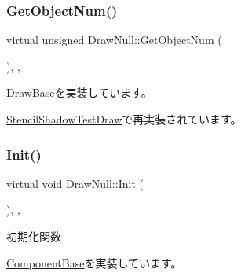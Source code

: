 \mbox{\label{class_draw_null_aaffa15d184f1d09512ccaa3bdad3f658}} 
\subsubsection{\texorpdfstring{Get\+Object\+Num()}{GetObjectNum()}}
{\footnotesize\ttfamily virtual unsigned Draw\+Null\+::\+Get\+Object\+Num (\begin{DoxyParamCaption}{ }\end{DoxyParamCaption})\hspace{0.3cm}{\ttfamily [inline]}, {\ttfamily [override]}, {\ttfamily [virtual]}}



\mbox{\hyperlink{class_draw_base_aed79e9db49de4fa2dff064495b877bcd}{Draw\+Base}}を実装しています。



\mbox{\hyperlink{class_stencil_shadow_test_draw_a8cc9a54a2bcb1fd006331fca1add02dc}{Stencil\+Shadow\+Test\+Draw}}で再実装されています。

\mbox{\label{class_draw_null_acd7fef3ccea1da537ac9507ffbb6dd2e}} 
\subsubsection{\texorpdfstring{Init()}{Init()}}
{\footnotesize\ttfamily virtual void Draw\+Null\+::\+Init (\begin{DoxyParamCaption}{ }\end{DoxyParamCaption})\hspace{0.3cm}{\ttfamily [inline]}, {\ttfamily [override]}, {\ttfamily [virtual]}}



初期化関数 



\mbox{\hyperlink{class_component_base_a125939d6befe42f28886a6523e86b18b}{Component\+Base}}を実装しています。



